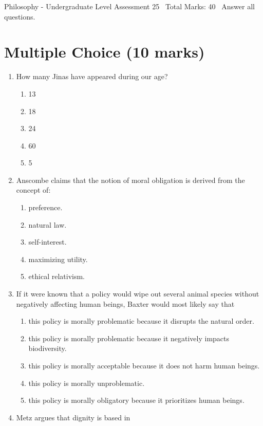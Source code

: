 \documentclass[12pt]{article}
\begin{document}
\begin{center}
Philosophy - Undergraduate Level Assessment 25 \
Total Marks: 40 \
Answer all questions.
\end{center}

\section*{Multiple Choice (10 marks)}
\begin{enumerate}[label=\arabic*.]
\item How many Jinas have appeared during our age?
\begin{enumerate}[label=(\alph*)]
    \item 13
    \item 18
    \item 24
    \item 60
    \item 5
\end{enumerate}
\item Anscombe claims that the notion of moral obligation is derived from the concept of:
\begin{enumerate}[label=(\alph*)]
    \item preference.
    \item natural law.
    \item self-interest.
    \item maximizing utility.
    \item ethical relativism.
\end{enumerate}
\item If it were known that a policy would wipe out several animal species without negatively affecting human beings, Baxter would most likely say that
\begin{enumerate}[label=(\alph*)]
    \item this policy is morally problematic because it disrupts the natural order.
    \item this policy is morally problematic because it negatively impacts biodiversity.
    \item this policy is morally acceptable because it does not harm human beings.
    \item this policy is morally unproblematic.
    \item this policy is morally obligatory because it prioritizes human beings.
\end{enumerate}
\item Metz argues that dignity is based in
\begin{enumerate}[label=(\alph*)]

\end{enumerate}
\end{enumerate}
\end{document}
